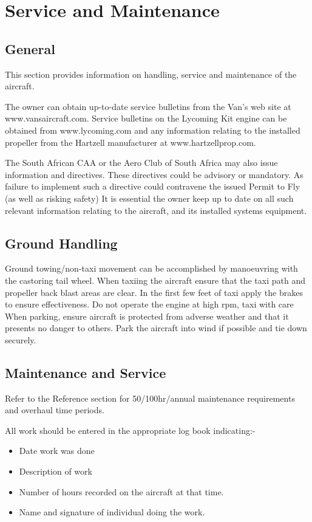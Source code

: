 \chapter{Service and Maintenance}
\thispagestyle{fancy}
\minitoc[n] %

\section{General}
This section provides information on handling, service and maintenance of the aircraft.

The owner can obtain up-to-date service bulletins from the Van’s web site at www.vansaircraft.com. 
Service bulletins on the Lycoming Kit engine can be obtained from www.lycoming.com and any information relating to the installed propeller from the Hartzell
manufacturer at www.hartzellprop.com.

The South African CAA or the Aero Club of South Africa may also issue information and directives. These
directives could be advisory or mandatory. As failure to implement such a directive could contravene the
issued Permit to Fly (as well as risking safety) It is essential the owner keep up to date on all such
relevant information relating to the aircraft, and its installed systems equipment.

\section{Ground Handling}
Ground towing/non-taxi movement can be accomplished by manoeuvring with the castoring tail wheel.  When
taxiing the aircraft ensure that the taxi path and propeller back blast areas are clear. In the first few feet of taxi
apply the brakes to ensure effectiveness. Do not operate the engine at high rpm, taxi with care
When parking, ensure aircraft is  protected from adverse weather and that it presents no danger to
others. Park the aircraft into wind if possible and tie down securely.


\section{Maintenance and Service}
Refer to the Reference section for 50/100hr/annual maintenance requirements and overhaul time periods.

All work should be entered in the appropriate log book indicating:-
\begin{itemize}
  \item Date work was done
  \item Description of work 
  \item Number of hours recorded on the aircraft at that time.
  \item Name and signature of individual doing the work.
\end{itemize}

